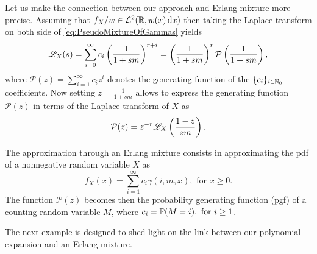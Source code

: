 Let us make the connection between our approach and Erlang mixture more precise. Assuming that $f_{X}/w\in\mathcal{L}^2(\mathbb{R}, w(x) \mathop{}\!\mathrm{d} x)$ then taking the Laplace transform on both side of \eqref{eq:PseudoMixtureOfGammas} yields
\begin{equation*}
\mathscr{L}_{X}(s)=\sum_{i=0}^{\infty} c_i \left(\frac{1}{1+sm}\right)^{r+i}
=\left(\frac{1}{1+sm}\right)^{r}\mathcal{P}\left(\frac{1}{1+sm}\right),\label{eq:PseudoErlangMixtureLaplaceTransform}
\end{equation*}
where $\mathcal{P}(z)=\sum_{i=1}^{\infty}c_i z^{i}$ denotes the generating function of the $\{c_i\}_{i\in\mathbb{N}_0}$ coefficients. Now setting $z=\frac{1}{1+sm}$ allows to express the generating function $\mathcal{P}(z)$ in terms of the Laplace transform of $X$ as
\begin{equation*}\label{eq:GeneratingFunctionPi}
\mathcal{P}(z)=z^{-r}\mathscr{L}_{X}\left(\frac{1-z}{zm}\right).
\end{equation*}

\begin{remark}
The approximation through an Erlang mixture consists in approximating the pdf of a nonnegative random variable $X$ as
\begin{equation*}\label{eq:ErlangMixtureRepresentation}
f_X(x)=\sum_{i=1}^{\infty}c_i\gamma(i,m,x),\text{ for }x\geq0.
\end{equation*}
The function $\mathcal{P}(z)$ becomes then the probability generating function (pgf) of a counting random variable $M$, where $c_i=\operatorname{{\mathbb P}}(M=i),\text{ for }i\geq1$.
\remQED
\end{remark}
The next example is designed to shed light on the link between our polynomial expansion and an Erlang mixture.

